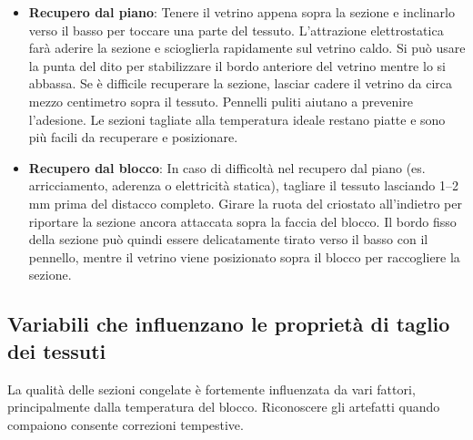 \begin{itemize}
\item \textbf{Recupero dal piano}: Tenere il vetrino appena sopra la sezione e inclinarlo verso il basso per toccare una parte del tessuto. L'attrazione elettrostatica farà aderire la sezione e scioglierla rapidamente sul vetrino caldo. Si può usare la punta del dito per stabilizzare il bordo anteriore del vetrino mentre lo si abbassa. Se è difficile recuperare la sezione, lasciar cadere il vetrino da circa mezzo centimetro sopra il tessuto. Pennelli puliti aiutano a prevenire l'adesione. Le sezioni tagliate alla temperatura ideale restano piatte e sono più facili da recuperare e posizionare.

\item \textbf{Recupero dal blocco}: In caso di difficoltà nel recupero dal piano (es. arricciamento, aderenza o elettricità statica), tagliare il tessuto lasciando 1–2 mm prima del distacco completo. Girare la ruota del criostato all'indietro per riportare la sezione ancora attaccata sopra la faccia del blocco. Il bordo fisso della sezione può quindi essere delicatamente tirato verso il basso con il pennello, mentre il vetrino viene posizionato sopra il blocco per raccogliere la sezione.
\end{itemize}

\subsection{Variabili che influenzano le proprietà di taglio dei tessuti}

La qualità delle sezioni congelate è fortemente influenzata da vari fattori, principalmente dalla temperatura del blocco. Riconoscere gli artefatti quando compaiono consente correzioni tempestive.

